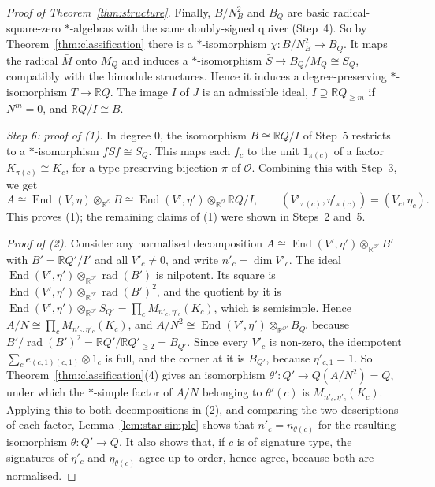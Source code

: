 \documentclass[12pt, a4paper]{report}
\theoremstyle{plain}
\theoremstyle{definition}
\theoremstyle{remark}
\theoremstyle{plain}
\newcommand{\rad}[0]{\operatorname{rad}} %
\newcommand{\RR}{\mathbb{R}}
\DeclareMathOperator{\End}{End}
\begin{document}
\begin{proof}[Proof of Theorem~\ref{thm:structure}]
Finally, $B/N_B^2$ and $B_Q$ are basic radical-square-zero $*$-algebras with the same doubly-signed quiver (Step~4). So by Theorem~\ref{thm:classification} there is a $*$-isomorphism $\chi:B/N_B^2\to B_Q$. It maps the radical $\bar M$ onto $M_Q$ and induces a $*$-isomorphism $\bar S\to B_Q/M_Q\cong S_Q$, compatibly with the bimodule structures. Hence it induces a degree-preserving $*$-isomorphism $T\to\RR Q$. The image $I$ of $J$ is an admissible ideal, $I\supseteq\RR Q_{\geq m}$ if $N^m=0$, and $\RR Q/I\cong B$.

\emph{Step 6: proof of (1).} In degree $0$, the isomorphism $B\cong\RR Q/I$ of Step~5 restricts to a $*$-isomorphism $fSf\cong S_Q$. This maps each $f_c$ to the unit $1_{\pi(c)}$ of a factor $K_{\pi(c)}\cong K_c$, for a type-preserving bijection $\pi$ of $\mathcal O$. Combining this with Step~3, we get
\[ A\cong\End(V,\eta)\otimes_{\RR^{\mathcal O}}B\cong\End(V',\eta')\otimes_{\RR^{\mathcal O}}\RR Q/I,\qquad (V'_{\pi(c)},\eta'_{\pi(c)})=(V_c,\eta_c). \]
This proves (1); the remaining claims of (1) were shown in Steps~2 and~5.

\emph{Proof of (2).} Consider any normalised decomposition $A\cong\End(V',\eta')\otimes_{\RR^{\mathcal O'}}B'$ with $B'=\RR Q'/I'$ and all $V'_c\neq0$, and write $n'_c=\dim V'_c$. The ideal $\End(V',\eta')\otimes_{\RR^{\mathcal O'}}\rad(B')$ is nilpotent. Its square is $\End(V',\eta')\otimes_{\RR^{\mathcal O'}}\rad(B')^2$, and the quotient by it is $\End(V',\eta')\otimes_{\RR^{\mathcal O'}}S_{Q'}=\prod_cM_{n'_c,\eta'_c}(K_c)$, which is semisimple. Hence $A/N\cong\prod_cM_{n'_c,\eta'_c}(K_c)$, and $A/N^2\cong\End(V',\eta')\otimes_{\RR^{\mathcal O'}}B_{Q'}$ because $B'/\rad(B')^2=\RR Q'/\RR Q'_{\geq2}=B_{Q'}$. Since every $V'_c$ is non-zero, the idempotent $\sum_ce_{(c,1)(c,1)}\otimes1_c$ is full, and the corner at it is $B_{Q'}$, because $\eta'_{c,1}=1$. So Theorem~\ref{thm:classification}(4) gives an isomorphism $\theta':Q'\to Q(A/N^2)=Q$, under which the $*$-simple factor of $A/N$ belonging to $\theta'(c)$ is $M_{n'_c,\eta'_c}(K_c)$. Applying this to both decompositions in (2), and comparing the two descriptions of each factor, Lemma~\ref{lem:star-simple} shows that $n'_c=n_{\theta(c)}$ for the resulting isomorphism $\theta:Q'\to Q$. It also shows that, if $c$ is of signature type, the signatures of $\eta'_c$ and $\eta_{\theta(c)}$ agree up to order, hence agree, because both are normalised.


\end{proof}
\end{document}
